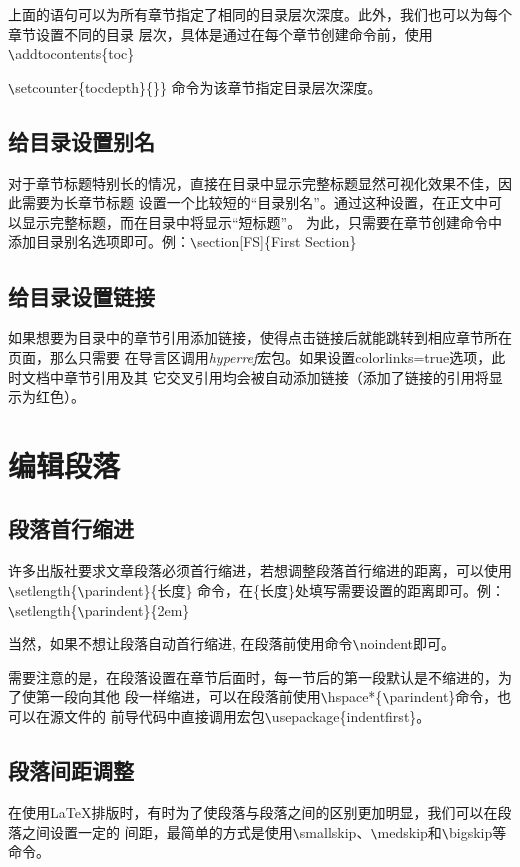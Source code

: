 上面的语句可以为所有章节指定了相同的目录层次深度。此外，我们也可以为每个章节设置不同的目录
层次，具体是通过在每个章节创建命令前，使用\verb|\|addtocontents\{toc\}{\verb|\|setcounter\{tocdepth\}\{\}\}
命令为该章节指定目录层次深度。

\subsection{给目录设置别名}
对于章节标题特别长的情况，直接在目录中显示完整标题显然可视化效果不佳，因此需要为长章节标题
设置一个比较短的“目录别名”。通过这种设置，在正文中可以显示完整标题，而在目录中将显示“短标题”。
为此，只需要在章节创建命令中添加目录别名选项即可。例：\verb|\|section[FS]\{First Section\}

\subsection{给目录设置链接}
如果想要为目录中的章节引用添加链接，使得点击链接后就能跳转到相应章节所在页面，那么只需要
在导言区调用\emph{hyperref}宏包。如果设置colorlinks=true选项，此时文档中章节引用及其
它交叉引用均会被自动添加链接（添加了链接的引用将显示为红色）。

\section{编辑段落}
\subsection{段落首行缩进}
许多出版社要求文章段落必须首行缩进，若想调整段落首行缩进的距离，可以使用\verb|\|setlength\{\verb|\|parindent\}\{长度\}
命令，在\{长度\}处填写需要设置的距离即可。例：\verb|\|setlength\{\verb|\|parindent\}\{2em\}

当然，如果不想让段落自动首行缩进, 在段落前使用命令\verb|\|noindent即可。

需要注意的是，在段落设置在章节后面时，每一节后的第一段默认是不缩进的，为了使第一段向其他
段一样缩进，可以在段落前使用\verb|\|hspace*\{\verb|\|parindent\}命令，也可以在源文件的
前导代码中直接调用宏包\verb|\|usepackage\{indentfirst\}。

\subsection{段落间距调整}
在使用LaTeX排版时，有时为了使段落与段落之间的区别更加明显，我们可以在段落之间设置一定的
间距，最简单的方式是使用\verb|\|smallskip、\verb|\|medskip和\verb|\|bigskip等命令。

}
